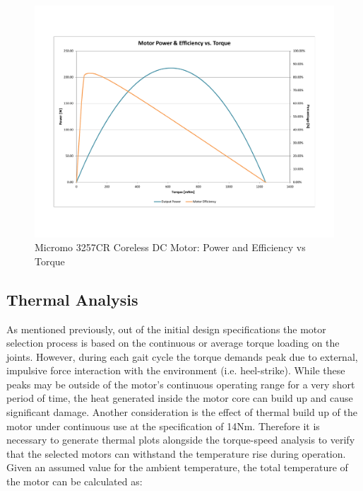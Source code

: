 \begin{figure}[!ht]
	\begin{center}
    \includegraphics[trim = 20mm 30mm 20mm 30mm,clip,width=15cm]{fig/design/motor2.pdf}
	\end{center}
  \caption{Micromo 3257CR Coreless DC Motor: Power and Efficiency vs Torque}
\end{figure}


\subsection{Thermal Analysis} %
\label{sub:thermal_analysis}
As mentioned previously, out of the initial design specifications the motor selection process is based on the continuous or average torque loading on the joints. However, during each gait cycle the torque demands peak due to external, impulsive force interaction with the environment (i.e. heel-strike). While these peaks may be outside of the motor's continuous operating range for a very short period of time, the heat generated inside the motor core can build up and cause significant damage. Another consideration is the effect of thermal build up of the motor under continuous use at the specification of 14Nm. Therefore it is necessary to generate thermal plots alongside the torque-speed analysis to verify that the selected motors can withstand the temperature rise during operation. Given an assumed value for the ambient temperature, the total temperature of the motor can be calculated as: 

